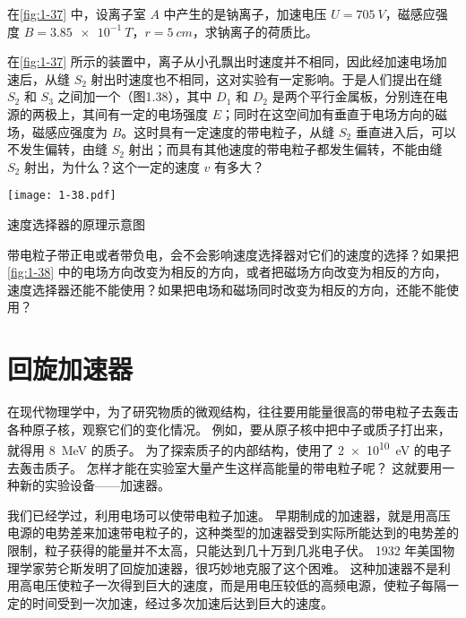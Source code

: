 \begin{Practice}
\begin{question}
  \item 在\cref{fig:1-37} 中，设离子室 $A$ 中产生的是钠离子，加速电压 $U=\qty{705}{V}$，磁感应强度 $B=\qty{3.85e-1}{T}$，$r=\qty{5}{cm}$，求钠离子的荷质比。
  \item 在\cref{fig:1-37} 所示的装置中，离子从小孔飘出时速度并不相同，因此经加速电场加速后，从缝 $S_2$ 射出时速度也不相同，这对实验有一定影响。于是人们提出在缝 $S_2$ 和 $S_3$ 之间加一个（图1.38），其中 $D_1$ 和 $D_2$ 是两个平行金属板，分别连在电源的两极上，其间有一定的电场强度 $E$；同时在这空间加有垂直于电场方向的磁场，磁感应强度为 $B$。这时具有一定速度的带电粒子，从缝 $S_2$ 垂直进入后，可以不发生偏转，由缝 $S_2$ 射出；而具有其他速度的带电粒子都发生偏转，不能由缝 $S_2$ 射出，为什么？这个一定的速度 $v$ 有多大？
  \begin{figurehere}
    \begin{minipage}{\linewidth}\centering
      \texttt{[image: 1-38.pdf]}
      \caption{速度选择器的原理示意图}\label{fig:1-38}
    \end{minipage}
  \end{figurehere}
  \item 带电粒子带正电或者带负电，会不会影响速度选择器对它们的速度的选择？如果把\cref{fig:1-38} 中的电场方向改变为相反的方向，或者把磁场方向改变为相反的方向，速度选择器还能不能使用？如果把电场和磁场同时改变为相反的方向，还能不能使用？
\end{question}
\end{Practice}

\section{回旋加速器}
在现代物理学中，为了研究物质的微观结构，往往要用能量很高的带电粒子去轰击各种原子核，观察它们的变化情况。
例如，要从原子核中把中子或质子打出来，就得用 \qty{8}{MeV} 的质子。
为了探索质子的内部结构，使用了 \qty{2e10}{eV} 的电子去轰击质子。
怎样才能在实验室大量产生这样高能量的带电粒子呢？
这就要用一种新的实验设备——加速器。

我们已经学过，利用电场可以使带电粒子加速。
早期制成的加速器，就是用高压电源的电势差来加速带电粒子的，这种类型的加速器受到实际所能达到的电势差的限制，粒子获得的能量并不太高，只能达到几十万到几兆电子伏。
1932 年美国物理学家劳仑斯发明了回旋加速器，很巧妙地克服了这个困难。
这种加速器不是利用高电压使粒子一次得到巨大的速度，而是用电压较低的高频电源，使粒子每隔一定的时间受到一次加速，经过多次加速后达到巨大的速度。

